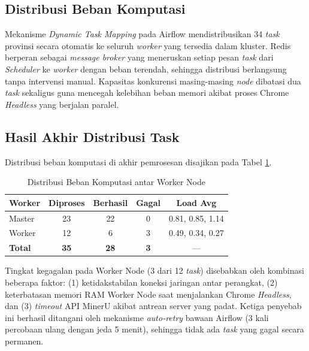 \documentclass[10pt, a4paper, twocolumn]{article}
\begin{document}
\subsection{Distribusi Beban Komputasi}

Mekanisme \textit{Dynamic Task Mapping} pada Airflow mendistribusikan 34 \textit{task} provinsi secara otomatis ke seluruh \textit{worker} yang tersedia dalam kluster. Redis berperan sebagai \textit{message broker} yang meneruskan setiap pesan \textit{task} dari \textit{Scheduler} ke \textit{worker} dengan beban terendah, sehingga distribusi berlangsung tanpa intervensi manual. Kapasitas konkurensi masing-masing \textit{node} dibatasi dua \textit{task} sekaligus guna mencegah kelebihan beban memori akibat proses Chrome \textit{Headless} yang berjalan paralel.

\subsection{Hasil Akhir Distribusi Task}

Distribusi beban komputasi di akhir pemrosesan disajikan pada Tabel \ref{tab:distribution}.

\begin{table}[H]
\centering
\caption{Distribusi Beban Komputasi antar Worker Node}
\label{tab:distribution}
\fontsize{8}{10}\selectfont
\begin{tabularx}{\linewidth}{|>{\raggedright\arraybackslash}X|c|c|c|c|}
\hline
\textbf{Worker} & \textbf{Diproses} & \textbf{Berhasil} & \textbf{Gagal} & \textbf{Load Avg} \\
\hline
Master & 23 & 22 & 0 & 0.81, 0.85, 1.14 \\
\hline
Worker & 12 & 6 & 3 & 0.49, 0.34, 0.27 \\
\hline
\textbf{Total} & \textbf{35} & \textbf{28} & \textbf{3} & --- \\
\hline
\end{tabularx}
\end{table}

\noindent Tingkat kegagalan pada Worker Node (3 dari 12 \textit{task}) disebabkan oleh kombinasi beberapa faktor: (1) ketidakstabilan koneksi jaringan antar perangkat, (2) keterbatasan memori RAM Worker Node saat menjalankan Chrome \textit{Headless}, dan (3) \textit{timeout} API MinerU akibat antrean server yang padat. Ketiga penyebab ini berhasil ditangani oleh mekanisme \textit{auto-retry} bawaan Airflow (3 kali percobaan ulang dengan jeda 5 menit), sehingga tidak ada \textit{task} yang gagal secara permanen.
\end{document}
